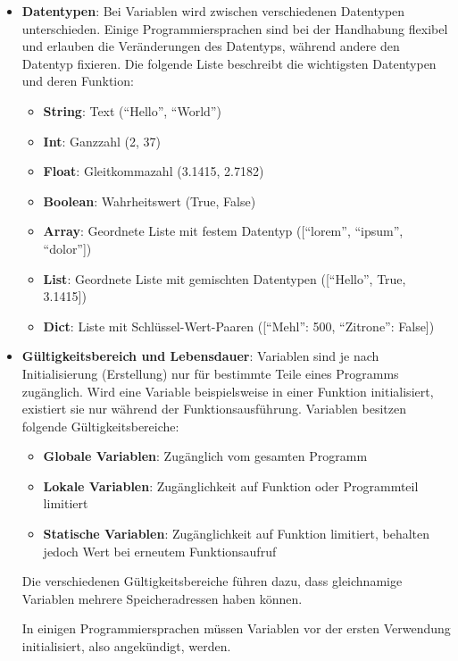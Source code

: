 \documentclass[11pt, a4paper]{article}
\begin{document}
\begin{itemize}
	\item \textbf{Datentypen}: Bei Variablen wird zwischen verschiedenen Datentypen unterschieden. Einige Programmiersprachen sind bei der Handhabung flexibel und erlauben die Veränderungen des Datentyps, während andere den Datentyp fixieren. Die folgende Liste beschreibt die wichtigsten Datentypen und deren Funktion:
	\begin{itemize}
		\item \textbf{String}: Text (``Hello'', ``World'')
		\item \textbf{Int}: Ganzzahl (2, 37)
		\item \textbf{Float}: Gleitkommazahl (3.1415, 2.7182)
		\item \textbf{Boolean}: Wahrheitswert (True, False)
		\item \textbf{Array}: Geordnete Liste mit festem Datentyp ([``lorem'', ``ipsum'', ``dolor''])
		\item \textbf{List}: Geordnete Liste mit gemischten Datentypen ([``Hello'', True, 3.1415])
		\item \textbf{Dict}: Liste mit Schlüssel-Wert-Paaren ([``Mehl'': 500, ``Zitrone'': False])
	\end{itemize}
	\item \textbf{Gültigkeitsbereich und Lebensdauer}: Variablen sind je nach Initialisierung (Erstellung) nur für bestimmte Teile eines Programms zugänglich. Wird eine Variable beispielsweise in einer Funktion initialisiert, existiert sie nur während der Funktionsausführung. Variablen besitzen folgende Gültigkeitsbereiche:
	\begin{itemize}
		\item \textbf{Globale Variablen}: Zugänglich vom gesamten Programm
		\item \textbf{Lokale Variablen}: Zugänglichkeit auf Funktion oder Programmteil limitiert
		\item \textbf{Statische Variablen}: Zugänglichkeit auf Funktion limitiert, behalten jedoch Wert bei erneutem Funktionsaufruf
	\end{itemize}
	Die verschiedenen Gültigkeitsbereiche führen dazu, dass gleichnamige Variablen mehrere Speicheradressen haben können.
	
	In einigen Programmiersprachen müssen Variablen vor der ersten Verwendung initialisiert, also angekündigt, werden. 
\end{itemize}
\end{document}
